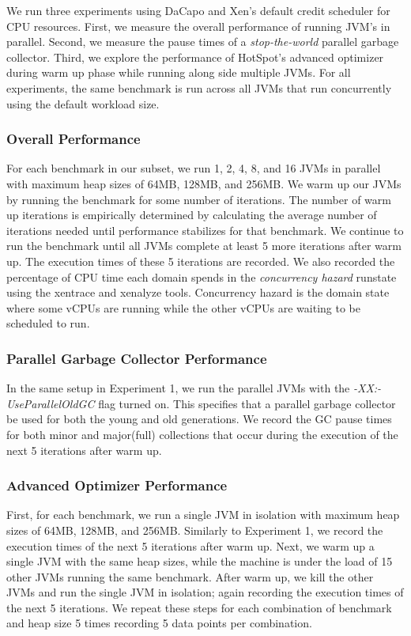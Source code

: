 \documentclass{sig-alternate}
\begin{document}
We run three experiments using DaCapo and Xen's default credit scheduler for CPU resources. First, we measure the overall performance of running JVM's in parallel. Second, we measure the pause times of a \textit{stop-the-world} parallel garbage collector. Third, we explore the performance of HotSpot's advanced optimizer during warm up phase while running along side multiple JVMs. For all experiments, the same benchmark is run across all JVMs that run concurrently using the default workload size.

\subsubsection{Overall Performance} \label{sssec:overallperf}
For each benchmark in our subset, we run 1, 2, 4, 8, and 16 JVMs in parallel with maximum heap sizes of 64MB, 128MB, and 256MB. We warm up our JVMs by running the benchmark for some number of iterations. The number of warm up iterations is empirically determined by calculating the average number of iterations needed until performance stabilizes for that benchmark. We continue to run the benchmark until all JVMs complete at least 5 more iterations after warm up.  The execution times of these 5 iterations are recorded. We also recorded the percentage of CPU time each domain spends in the \textit{concurrency hazard} runstate using the xentrace and xenalyze tools. Concurrency hazard is the domain state where some vCPUs are running while the other vCPUs are waiting to be scheduled to run. 

\subsubsection{Parallel Garbage Collector Performance}
In the same setup in Experiment 1, we run the parallel JVMs with the \textit{-XX:-UseParallelOldGC} flag turned on. This specifies that a parallel garbage collector be used for both the young and old generations. We record the GC pause times for both minor and major(full) collections that occur during the execution of the next 5 iterations after warm up.

\subsubsection{Advanced Optimizer Performance}
First, for each benchmark, we run a single JVM in isolation with maximum heap sizes of 64MB, 128MB, and 256MB. Similarly to Experiment 1, we record the execution times of the next 5 iterations after warm up. Next, we warm up a single JVM with the same heap sizes, while the machine is under the load of 15 other JVMs running the same benchmark. After warm up, we kill the other JVMs and run the single JVM in isolation; again recording the execution times of the next 5 iterations. We repeat these steps for each combination of benchmark and heap size 5 times recording 5 data points per combination.
\end{document}
